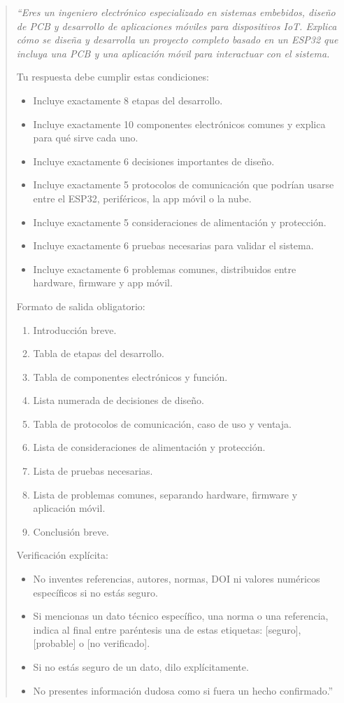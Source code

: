 \documentclass[11pt,a4paper]{article}
\begin{document}
\begin{quote}
\itshape
``Eres un ingeniero electrónico especializado en sistemas embebidos, diseño de PCB y desarrollo de aplicaciones móviles para dispositivos IoT. Explica cómo se diseña y desarrolla un proyecto completo basado en un ESP32 que incluya una PCB y una aplicación móvil para interactuar con el sistema.

Tu respuesta debe cumplir estas condiciones:
\begin{itemize}
\item Incluye exactamente 8 etapas del desarrollo.
\item Incluye exactamente 10 componentes electrónicos comunes y explica para qué sirve cada uno.
\item Incluye exactamente 6 decisiones importantes de diseño.
\item Incluye exactamente 5 protocolos de comunicación que podrían usarse entre el ESP32, periféricos, la app móvil o la nube.
\item Incluye exactamente 5 consideraciones de alimentación y protección.
\item Incluye exactamente 6 pruebas necesarias para validar el sistema.
\item Incluye exactamente 6 problemas comunes, distribuidos entre hardware, firmware y app móvil.
\end{itemize}

Formato de salida obligatorio:
\begin{enumerate}
\item Introducción breve.
\item Tabla de etapas del desarrollo.
\item Tabla de componentes electrónicos y función.
\item Lista numerada de decisiones de diseño.
\item Tabla de protocolos de comunicación, caso de uso y ventaja.
\item Lista de consideraciones de alimentación y protección.
\item Lista de pruebas necesarias.
\item Lista de problemas comunes, separando hardware, firmware y aplicación móvil.
\item Conclusión breve.
\end{enumerate}

Verificación explícita:
\begin{itemize}
\item No inventes referencias, autores, normas, DOI ni valores numéricos específicos si no estás seguro.
\item Si mencionas un dato técnico específico, una norma o una referencia, indica al final entre paréntesis una de estas etiquetas: [seguro], [probable] o [no verificado].
\item Si no estás seguro de un dato, dilo explícitamente.
\item No presentes información dudosa como si fuera un hecho confirmado.''
\end{itemize}
\end{quote}
\end{document}
